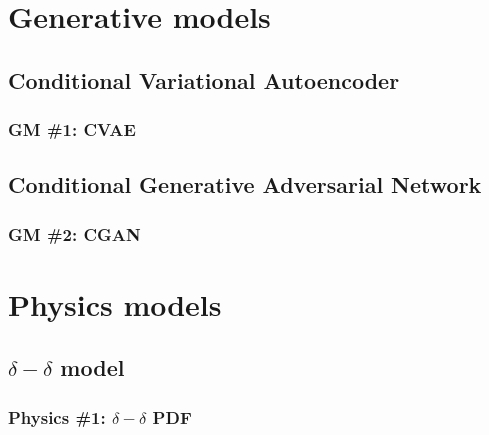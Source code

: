 \documentclass[xcolor=dvipsnames]{beamer}
\begin{document}
{
  
}

\section[Generative models]{Generative models}\label{sec:gm}
\subsection{Conditional Variational Autoencoder}\label{sec:CVAE}
\begin{frame}[fragile]
  \frametitle{GM \#1: CVAE}
  {\small }
\end{frame}

{
  
  
}

{
  
}

\subsection{Conditional Generative Adversarial Network}\label{sec:CGAN}
\begin{frame}[fragile]
  \frametitle{GM \#2: CGAN}
  {\small }
\end{frame}

{
  
  
}

{
  
}

\section{Physics models}\label{sec:physics}
\subsection{$\delta-\delta$ model}\label{sec:DD}
\begin{frame}[fragile]
  \frametitle{Physics \#1: $\delta-\delta$ PDF}
  {\small }
\end{frame}
\end{document}
